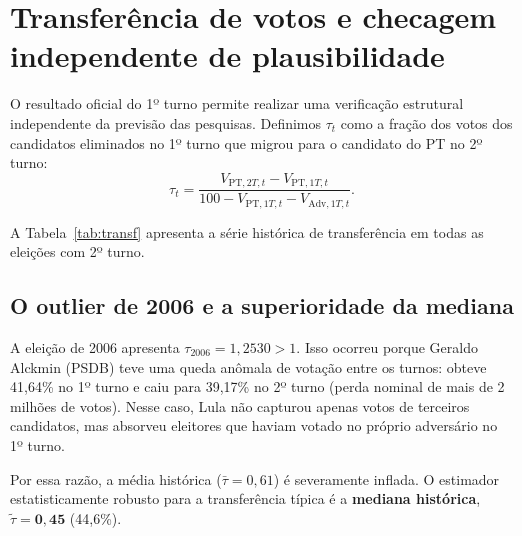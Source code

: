 \documentclass[10.5pt,a4paper]{article}
\begin{document}
\begin{table}[h]
\centering\small
\caption{Calibração dos pesos no modelo M2\_2T para as pesquisas de 2026.}
\label{tab:pesos}

\end{table}

\section{Transferência de votos e checagem independente de plausibilidade}

O resultado oficial do 1º turno permite realizar uma verificação estrutural independente da previsão das pesquisas. Definimos $\tau_t$ como a fração dos votos dos candidatos eliminados no 1º turno que migrou para o candidato do PT no 2º turno:
\begin{equation}
\tau_t = \frac{V_{\text{PT}, 2T, t} - V_{\text{PT}, 1T, t}}{100 - V_{\text{PT}, 1T, t} - V_{\text{Adv}, 1T, t}}.
\end{equation}

A Tabela~\ref{tab:transf} apresenta a série histórica de transferência em todas as eleições com 2º turno.

\begin{table}[h]
\centering\small
\caption{Transferência aparente de votos do 1º para o 2º turno (\% dos válidos).}
\label{tab:transf}

\end{table}

\subsection{O outlier de 2006 e a superioridade da mediana}
A eleição de 2006 apresenta $\tau_{2006} = 1{,}2530 > 1$. Isso ocorreu porque Geraldo Alckmin (PSDB) teve uma queda anômala de votação entre os turnos: obteve 41,64\% no 1º turno e caiu para 39,17\% no 2º turno (perda nominal de mais de 2 milhões de votos). Nesse caso, Lula não capturou apenas votos de terceiros candidatos, mas absorveu eleitores que haviam votado no próprio adversário no 1º turno.

Por essa razão, a média histórica ($\bar{\tau} = 0{,}61$) é severamente inflada. O estimador estatisticamente robusto para a transferência típica é a \textbf{mediana histórica}, $\tilde{\tau} = \mathbf{0{,}45}$ (44,6\%).
\end{document}
